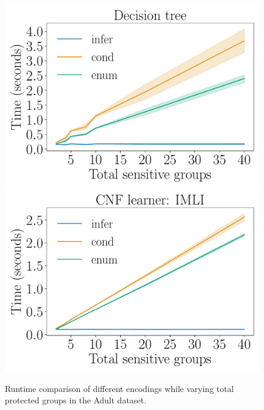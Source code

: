 \begin{figure}[t!]
	\begin{center}
		\includegraphics[scale=.32]{figures/fairness/justicia/encoding_runtime_Adult_DT.pdf}
		\includegraphics[scale=.32]{figures/fairness/justicia/encoding_runtime_Adult_IMLI.pdf}
		\hfill
		\caption{Runtime comparison of different encodings while varying total protected groups in the Adult dataset.}
		\label{fairness_justicia_fig:runtime_diff_encodings}
	\end{center}
\end{figure}



